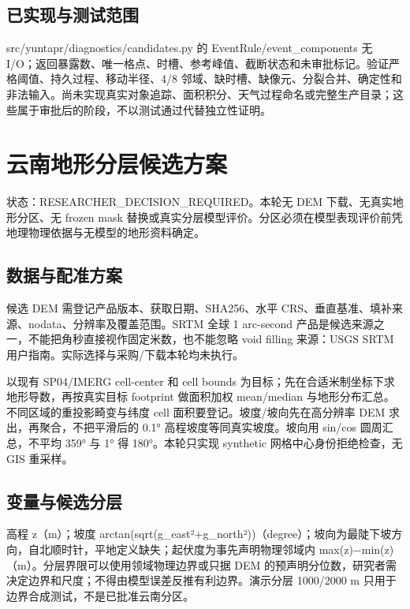 \documentclass[UTF8,a4paper,10pt,fontset=fandol]{ctexart}
\begin{document}
\subsection*{已实现与测试范围}

src/yuntapr/diagnostics/candidates.py 的 EventRule/event\_\allowbreak{}components 无 I/O；返回暴露数、唯一格点、时槽、参考峰值、截断状态和未审批标记。验证严格阈值、持久过程、移动半径、4/8 邻域、缺时槽、缺像元、分裂合并、确定性和非法输入。尚未实现真实对象追踪、面积积分、天气过程命名或完整生产目录；这些属于审批后的阶段，不以测试通过代替独立性证明。\par

\clearpage
\section*{云南地形分层候选方案}

状态：RESEARCHER\_\allowbreak{}DECISION\_\allowbreak{}REQUIRED。本轮无 DEM 下载、无真实地形分区、无 frozen mask 替换或真实分层模型评价。分区必须在模型表现评价前凭地理物理依据与无模型的地形资料确定。\par

\subsection*{数据与配准方案}

候选 DEM 需登记产品版本、获取日期、SHA256、水平 CRS、垂直基准、填补来源、nodata、分辨率及覆盖范围。SRTM 全球 1 arc-second 产品是候选来源之一，不能把角秒直接视作固定米数，也不能忽略 void filling 来源：USGS SRTM 用户指南。实际选择与采购/下载本轮均未执行。\par

以现有 SP04/IMERG cell-center 和 cell bounds 为目标；先在合适米制坐标下求地形导数，再按真实目标 footprint 做面积加权 mean/median 与地形分布汇总。不同区域的重投影畸变与纬度 cell 面积要登记。坡度/坡向先在高分辨率 DEM 求出，再聚合，不把平滑后的 0.1° 高程坡度等同真实坡度。坡向用 sin/cos 圆周汇总，不平均 359° 与 1° 得 180°。本轮只实现 synthetic 网格中心身份拒绝检查，无 GIS 重采样。\par

\subsection*{变量与候选分层}

高程 z（m）；坡度 arctan(sqrt(g\_\allowbreak{}east²+g\_\allowbreak{}north²))（degree）；坡向为最陡下坡方向，自北顺时针，平地定义缺失；起伏度为事先声明物理邻域内 max(z)−min(z)（m）。分层界限可以使用领域物理边界或只据 DEM 的预声明分位数，研究者需决定边界和尺度；不得由模型误差反推有利边界。演示分层 1000/2000 m 只用于边界合成测试，不是已批准云南分区。\par
\end{document}
